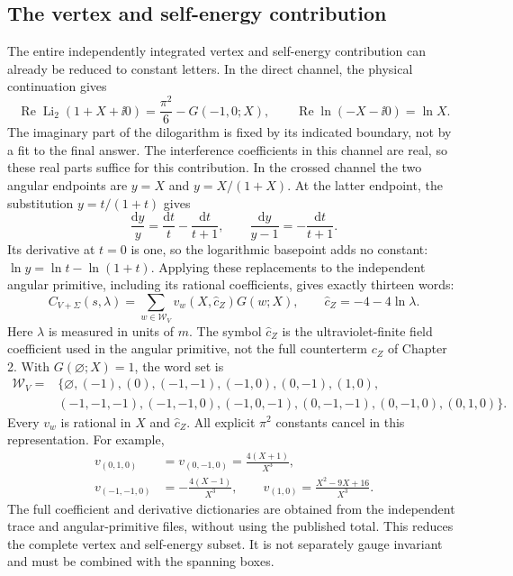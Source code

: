 \subsection{The vertex and self-energy contribution}
The entire independently integrated vertex and self-energy contribution
can already be reduced to constant letters.  In the direct channel, the
physical continuation gives
\begin{equation}
 \operatorname{Re}\operatorname{Li}_2(1+X+\ii0)
 =\frac{\pi^2}{6}-G(-1,0;X),\qquad
 \operatorname{Re}\ln(-X-\ii0)=\ln X.
\end{equation}
The imaginary part of the dilogarithm is fixed by its indicated boundary,
not by a fit to the final answer.  The interference coefficients in this
channel are real, so these real parts suffice for this contribution.
In the crossed channel the two angular endpoints are $y=X$ and
$y=X/(1+X)$.  At the latter endpoint, the substitution $y=t/(1+t)$ gives
\begin{equation}
 \frac{\mathrm{d}y}{y}=\frac{\mathrm{d}t}{t}
 -\frac{\mathrm{d}t}{t+1},\qquad
 \frac{\mathrm{d}y}{y-1}=-\frac{\mathrm{d}t}{t+1}.
\end{equation}
Its derivative at $t=0$ is one, so the logarithmic basepoint adds no
constant: $\ln y=\ln t-\ln(1+t)$.  Applying these replacements to the
independent angular primitive, including its rational coefficients,
gives exactly thirteen words:
\begin{equation}
 C_{V+\Sigma}(s,\lambda)
 =\sum_{w\in\mathcal W_V}v_w(X,\widehat c_Z)G(w;X),\qquad
 \widehat c_Z=-4-4\ln\lambda.
\end{equation}
Here $\lambda$ is measured in units of $m$. The symbol
$\widehat c_Z$ is the ultraviolet-finite field coefficient used in the
angular primitive, not the full counterterm $c_Z$ of Chapter 2.
With $G(\varnothing;X)=1$, the word set is
\begin{align}
 \mathcal W_V={}&\{\varnothing,(-1),(0),(-1,-1),(-1,0),(0,-1),(1,0),\\
 &(-1,-1,-1),(-1,-1,0),(-1,0,-1),(0,-1,-1),(0,-1,0),(0,1,0)\}.
\end{align}
Every $v_w$ is rational in $X$ and $\widehat c_Z$.  All explicit $\pi^2$ constants
cancel in this representation.  For example,
\begin{align}
 v_{(0,1,0)}&=v_{(0,-1,0)}=\frac{4(X+1)}{X^3},\\
 v_{(-1,-1,0)}&=-\frac{4(X-1)}{X^3},\qquad
 v_{(1,0)}=\frac{X^2-9X+16}{X^3}.
\end{align}
The full coefficient and derivative dictionaries are obtained from the
independent trace and angular-primitive files, without using the
published total.  This reduces the complete vertex and self-energy subset. It is not
separately gauge invariant and must be combined with the spanning boxes.


